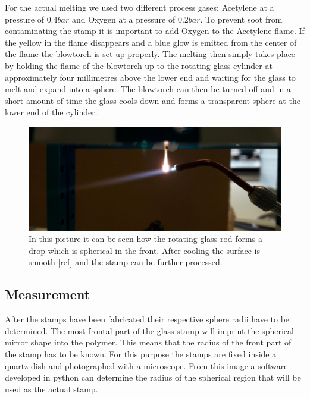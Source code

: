For the actual melting we used two different process gases: Acetylene at a pressure of $0.4\si{bar}$ and Oxygen at a pressure of $0.2\si{bar}$. To prevent soot from contaminating the stamp it is important to add Oxygen to the Acetylene flame. If the yellow in the flame disappears and a blue glow is emitted from the center of the flame the blowtorch is set up properly. The melting then simply takes place by holding the flame of the blowtorch up to the rotating glass cylinder at approximately four millimetres above the lower end and waiting for the glass to melt and expand into a sphere. The blowtorch can then be turned off and in a short amount of time the glass cools down and forms a transparent sphere at the lower end of the cylinder.
\begin{figure}[H]
	\includegraphics[scale=0.13]{source/melting}
	\caption{In this picture it can be seen how the rotating glass rod forms a drop which is spherical in the front. After cooling the surface is smooth [ref] and the stamp can be further processed.}
\end{figure}

\subsection{Measurement}\label{ChapMeasurement}
After the stamps have been fabricated their respective sphere radii have to be determined. The most frontal part of the glass stamp will imprint the spherical mirror shape into the polymer. This means that the radius of the front part of the stamp has to be known. For this purpose the stamps are fixed inside a quartz-dish and photographed with a microscope. From this image a software developed in python can determine the radius of the spherical region that will be used as the actual stamp.

